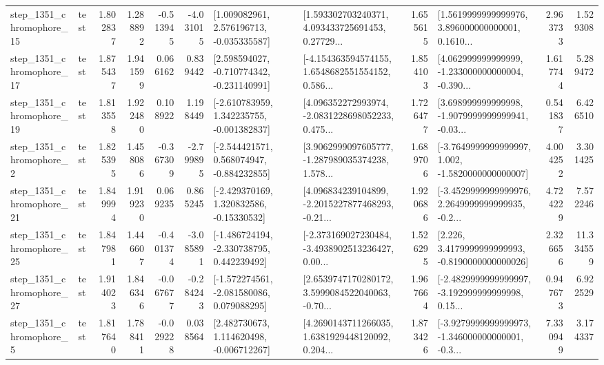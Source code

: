 \begin{tabular}{llrrrrllrlrr}
 step\_1351\_chromophore\_15 &      test &      1.802837 &    1.288892 &     -0.513945 & -4.031015 &    [1.009082961, 2.576196713, -0.035335587] &  [1.593302703240371, 4.093433725691453, 0.27729... &       1.655615 &  [1.5619999999999976, 3.896000000000001, 0.1610... &            2.963733 &          1.529308 \\
 step\_1351\_chromophore\_17 &      test &      1.875437 &    1.941599 &      0.066162 &  0.839442 &   [2.598594027, -0.710774342, -0.231140991] &  [-4.154363594574155, 1.6548682551554152, 0.586... &       1.854103 &  [4.062999999999999, -1.233000000000004, -0.390... &            1.617744 &          5.289472 \\
 step\_1351\_chromophore\_19 &      test &      1.813558 &    1.922480 &      0.108922 &  1.198449 &   [-2.610783959, 1.342235755, -0.001382837] &  [4.096352272993974, -2.0831228698052233, 0.475... &       1.726477 &  [3.698999999999998, -1.9079999999999941, -0.03... &            0.541837 &          6.426510 \\
  step\_1351\_chromophore\_2 &      test &      1.825395 &    1.458086 &     -0.367309 & -2.799895 &   [-2.544421571, 0.568074947, -0.884232855] &  [3.9062999097605777, -1.287989035374238, 1.578... &       1.689706 &  [-3.7649999999999997, 1.002, -1.5820000000000007] &            4.004252 &          3.301425 \\
 step\_1351\_chromophore\_21 &      test &      1.849994 &    1.919230 &      0.069235 &  0.865245 &    [-2.429370169, 1.320832586, -0.15330532] &  [4.096834239104899, -2.2015227877468293, -0.21... &       1.920686 &  [-3.4529999999999976, 2.2649999999999935, -0.2... &            4.724229 &          7.572246 \\
 step\_1351\_chromophore\_25 &      test &      1.847981 &    1.446607 &     -0.401374 & -3.085891 &   [-1.486724194, -2.330738795, 0.442239492] &  [-2.373169027230484, -3.4938902513236427, 0.00... &       1.526295 &   [2.226, 3.4179999999999993, -0.8190000000000026] &            2.326656 &         11.334559 \\
 step\_1351\_chromophore\_27 &      test &      1.914023 &    1.846346 &     -0.067677 & -0.284243 &   [-1.572274561, -2.081580086, 0.079088295] &  [2.6539747170280172, 3.5999084522040063, -0.70... &       1.967664 &  [-2.4829999999999997, -3.192999999999998, 0.15... &            0.947673 &          6.922529 \\
  step\_1351\_chromophore\_5 &      test &      1.817640 &    1.788411 &     -0.029228 &  0.038564 &    [2.482730673, 1.114620498, -0.006712267] &  [4.2690143711266035, 1.6381929448120092, 0.204... &       1.873426 &  [-3.9279999999999973, -1.346000000000001, -0.3... &            7.330949 &          3.174337 \\

\end{tabular}
